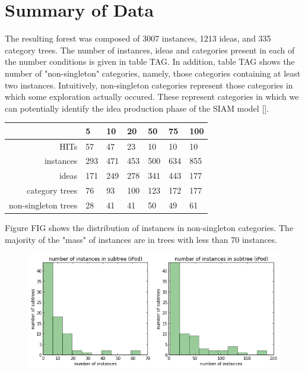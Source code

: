 \section{Summary of Data}

The resulting forest was composed of 3007 instances, 1213 ideas, and 335 category trees. The number of instances, ideas and categories present in each of the number conditions is given in table TAG. In addition, table TAG shows the number of "non-singleton" categories, namely, those categories containing at least two instances. Intuitively, non-singleton categories represent those categories in which some exploration actually occured. These represent categories in which we can potentially identify the idea production phase of the SIAM model [].

\begin{tabular}[h!]{r | l l l l l l }
& 5 & 10 & 20 & 50 & 75 & 100 \\ \hline \hline
HITs & 57 & 47 & 23 & 10 & 10 & 10 \\
instances & 293 & 471 & 453 & 500 & 634 & 855 \\
ideas & 171 & 249 & 278 & 341 & 443 & 177 \\
category trees & 76 & 93 & 100 & 123 & 172 & 177 \\
non-singleton trees & 28 & 41 & 41 & 50 & 49 & 61 \\
\end{tabular}

Figure FIG shows the distribution of instances in non-singleton categories. The majority of the "mass" of instances are in trees with less than 70 instances.

\begin{figure}[!h]
    \centering
    \includegraphics[width=0.9\columnwidth]{instances_in_subtrees}
\end{figure}